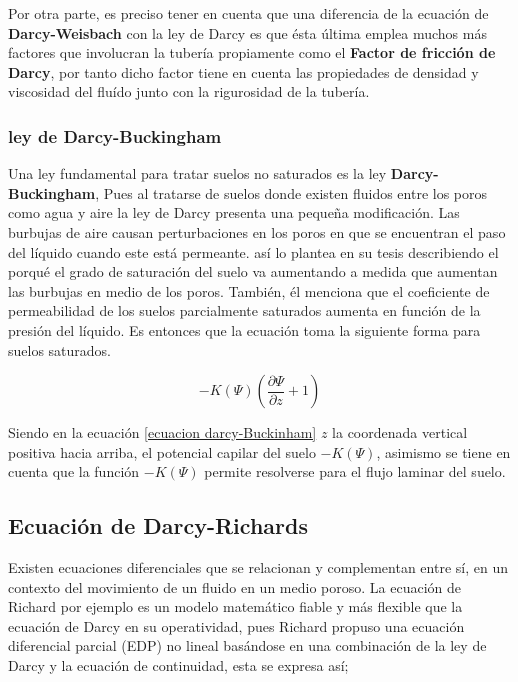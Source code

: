 Por otra parte, es preciso tener en cuenta que una diferencia de la ecuación de \textbf{Darcy-Weisbach} con la ley de Darcy es que ésta última emplea muchos más factores que involucran la tubería propiamente como el \textbf{Factor de fricción de Darcy}, por tanto dicho factor tiene en cuenta las propiedades de densidad y viscosidad del fluído junto con la rigurosidad de la tubería.

\subsubsection{ley de Darcy-Buckingham}

Una ley fundamental para tratar suelos no saturados es la ley \textbf{Darcy-Buckingham}, Pues al tratarse de suelos donde existen fluidos entre los poros como agua y aire la ley de Darcy presenta una pequeña modificación. Las burbujas de aire causan perturbaciones en los poros en que se encuentran el paso del líquido cuando este está permeante. así lo plantea en su tesis \parencite{Friaspineda2018} describiendo el porqué el grado de saturación del suelo va aumentando a  medida que aumentan las burbujas en medio de los poros. También, él menciona que el coeficiente de permeabilidad de los suelos parcialmente saturados aumenta en función de la presión del líquido. Es entonces que la ecuación toma la siguiente forma para suelos saturados.

\begin{equation}
	-K(\Psi)\left(\frac{\partial \Psi}{\partial z}+1\right)
	\label{ecuacion darcy-Buckinham}
\end{equation}

Siendo en la ecuación \eqref{ecuacion darcy-Buckinham} $z$ la coordenada vertical positiva hacia arriba, el potencial capilar del suelo $-K(\Psi)$, asimismo se tiene en cuenta que la función $-K(\Psi)$ permite resolverse para el flujo laminar del suelo.




\subsection{Ecuación de Darcy-Richards}

Existen ecuaciones diferenciales que se relacionan y complementan entre sí, en un contexto del movimiento de un fluido en un medio poroso. La ecuación de Richard por ejemplo es un modelo matemático fiable y más flexible que la ecuación de Darcy en su  operatividad, pues Richard propuso una ecuación diferencial parcial (EDP) no lineal basándose en una combinación de la ley de Darcy y la ecuación de continuidad, esta se expresa así; 

